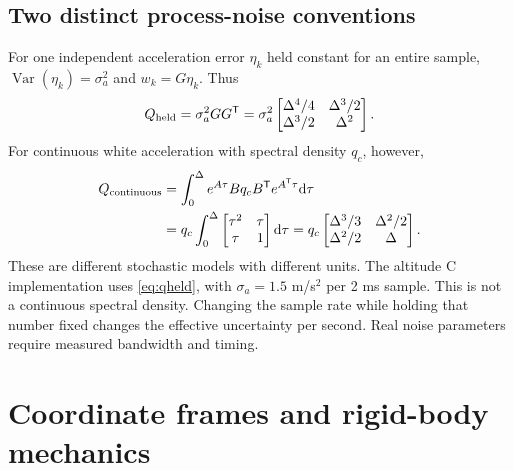 \section{Two distinct process-noise conventions}
For one independent acceleration error $\eta_k$ held constant for an entire
sample, $\operatorname{Var}(\eta_k)=\sigma_a^2$ and $w_k=G\eta_k$.
Thus
\begin{equation}\label{eq:qheld}
Q_{\rm held}=\sigma_a^2GG^{\mathsf T}
=\sigma_a^2\begin{bmatrix}\Delta^4/4&\Delta^3/2\\\Delta^3/2&\Delta^2\end{bmatrix}.
\end{equation}
For continuous white acceleration with spectral density $q_c$, however,
\begin{align}
Q_{\rm continuous}
&=\int_0^\Delta e^{A\tau}Bq_cB^{\mathsf T}e^{A^{\mathsf T}\tau}\mathrm{d}\tau\\
&=q_c\int_0^\Delta\begin{bmatrix}\tau^2&\tau\\\tau&1\end{bmatrix}\mathrm{d}\tau
=q_c\begin{bmatrix}\Delta^3/3&\Delta^2/2\\\Delta^2/2&\Delta\end{bmatrix}.
\end{align}
These are different stochastic models with different units. The altitude C
implementation uses \eqref{eq:qheld}, with $\sigma_a=1.5$ m/s$^2$ per
2 ms sample. This is not a continuous spectral density. Changing the sample
rate while holding that number fixed changes the effective uncertainty per
second. Real noise parameters require measured bandwidth and timing.

\chapter{Coordinate frames and rigid-body mechanics}
